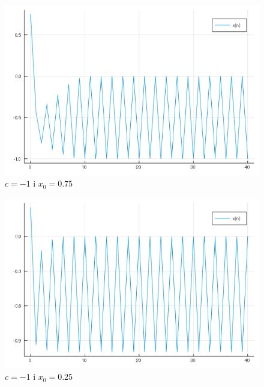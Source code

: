 \documentclass{article}
\begin{document}
\begin{figure}[H]
	\includegraphics[width=\linewidth]{zad6_6.png}
	\caption{$c=-1$ i $x_{0}=0.75$}
	\label{fig:z66}
\end{figure}
\begin{figure}[H]
	\includegraphics[width=\linewidth]{zad6_7.png}
	\caption{$c=-1$ i $x_{0}=0.25$}
	\label{fig:z67}
\end{figure}
\end{document}
